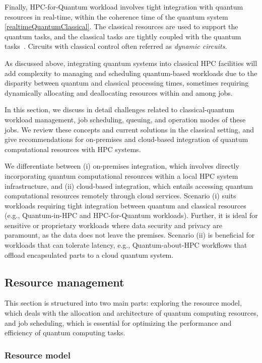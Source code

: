 Finally, HPC-for-Quantum workload involves tight integration with quantum resources in real-time, within the coherence time of the quantum system \ref{realtimeQuantumClassical}. The classical resources are used to support the quantum tasks, and the classical tasks are tightly coupled with the quantum tasks~\cite{saurabh2023conceptual}. Circuits with classical control often referred as \textit{dynamic circuits}.

As discussed above, integrating quantum systems into classical HPC facilities will add complexity to managing and scheduling quantum-based workloads due to the disparity between quantum and classical processing times, sometimes requiring dynamically allocating and deallocating resources within and among jobs.

In this section, we discuss in detail challenges related to classical-quantum workload management, job scheduling, queuing, and operation modes of these jobs.
We review these concepts and current solutions in the classical setting, and give recommendations for
on-premises and cloud-based integration of quantum computational resources with HPC systems.


We differentiate between (i) on-premises integration, which involves directly incorporating quantum computational resources within a local HPC system infrastructure, and (ii) cloud-based integration, which entails accessing quantum computational resources remotely through cloud services.
Scenario (i) suits workloads requiring tight integration between quantum and classical resources (e.g., Quantum-in-HPC and HPC-for-Quantum workloads). Further, it is ideal for sensitive or proprietary workloads where data security and privacy are paramount, as the data does not leave the premises. Scenario (ii) is beneficial for workloads that can tolerate latency, e.g., Quantum-about-HPC workflows that offload encapsulated parts to a cloud quantum system.




\subsection{Resource management}

This section is structured into two main parts: exploring the resource model, which deals with the allocation and architecture of quantum computing resources, and job scheduling, which is essential for optimizing the performance and efficiency of quantum computing tasks.

\subsubsection{Resource model}

